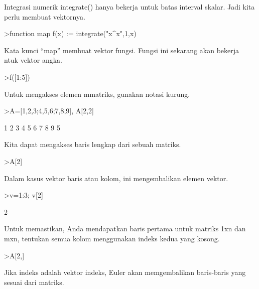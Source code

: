\documentclass[a4paper,10pt]{article}
\begin{document}
\begin{eulernotebook}
\begin{eulercomment}
\begin{eulercomment}
\begin{eulercomment}
\begin{eulercomment}
\begin{eulercomment}
Integrasi numerik integrate() hanya bekerja untuk batas interval
skalar. Jadi kita perlu membuat vektornya.
\end{eulercomment}
\begin{eulerprompt}
>function map f(x) := integrate("x^x",1,x)
\end{eulerprompt}
\begin{eulercomment}
Kata kunci “map” membuat vektor fungsi. Fungsi ini sekarang akan
bekerja\\
ntuk vektor angka.
\end{eulercomment}
\begin{eulerprompt}
>f([1:5])
\end{eulerprompt}
\begin{euleroutput}
  [0,  2.05045,  13.7251,  113.336,  1241.03]
\end{euleroutput}
\begin{eulercomment}
Untuk mengakses elemen mmatriks, gunakan notasi kurung. 

\end{eulercomment}
\begin{eulerprompt}
>A=[1,2,3;4,5,6;7,8,9], A[2,2]
\end{eulerprompt}
\begin{euleroutput}
              1             2             3 
              4             5             6 
              7             8             9 
  5
\end{euleroutput}
\begin{eulercomment}
Kita dapat mengakses baris lengkap dari sebuah matriks.
\end{eulercomment}
\begin{eulerprompt}
>A[2]
\end{eulerprompt}
\begin{euleroutput}
  [4,  5,  6]
\end{euleroutput}
\begin{eulercomment}
Dalam kasus vektor baris atau kolom, ini mengembalikan elemen vektor.
\end{eulercomment}
\begin{eulerprompt}
>v=1:3; v[2]
\end{eulerprompt}
\begin{euleroutput}
  2
\end{euleroutput}
\begin{eulercomment}
Untuk memastikan, Anda mendapatkan baris pertama untuk matriks 1xn dan
mxn, tentukan semua kolom menggunakan indeks kedua yang kosong.
\end{eulercomment}
\begin{eulerprompt}
>A[2,]
\end{eulerprompt}
\begin{euleroutput}
  [4,  5,  6]
\end{euleroutput}
\begin{eulercomment}
Jika indeks adalah vektor indeks, Euler akan memgembalikan baris-baris
yang sesuai dari matriks.


\end{eulercomment}
\end{eulercomment}
\end{eulercomment}
\end{eulercomment}
\end{eulercomment}
\end{eulernotebook}
\end{document}
